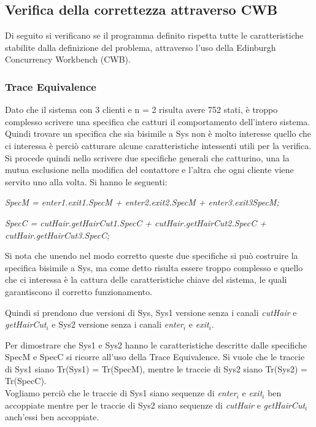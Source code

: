 \subsection{Verifica della correttezza attraverso CWB }

Di seguito si verificano se il programma definito rispetta tutte le caratteristiche stabilite dalla definizione del problema, attraverso l'uso della Edinburgh Concurrency Workbench (CWB).

\subsubsection{Trace Equivalence} 

Dato che il sistema con 3 clienti e n = 2 risulta avere 752 stati, è troppo complesso scrivere una specifica che catturi il comportamento dell'intero sistema. Quindi trovare un specifica che sia bisimile a Sys non è molto interesse quello che ci interessa è perciò catturare alcune caratteristiche intessenti utili per la verifica. Si procede quindi nello scrivere due specifiche generali che catturino, una la mutua esclusione nella modifica del contattore e l'altra che ogni cliente viene servito uno alla volta. Si hanno le seguenti:

\emph{SpecM = enter1.exit1.SpecM + enter2.exit2.SpecM + enter3.exit3SpecM;}

\emph{SpecC = cutHair.getHairCut1.SpecC + cutHair.getHairCut2.SpecC +\\ cutHair.getHairCut3.SpecC;}

Si nota che  unendo nel modo corretto queste due specifiche si può costruire la specifica bisimile a Sys, ma come detto risulta essere troppo complesso e quello che ci interessa è la cattura delle caratteristiche chiave del sistema, le quali garantiscono il corretto funzionamento.

Quindi si prendono due versioni di Sys, Sys1 versione senza i canali \emph{cutHair} e \emph{getHairCut$_{i}$} e Sys2 versione senza i canali \emph{enter$_{i}$} e \emph{exit$_{i}$}.

Per dimostrare che Sys1 e Sys2 hanno le caratteristiche descritte dalle specifiche SpecM e SpecC si ricorre all'uso della Trace Equivalence. Si vuole che le traccie di Sys1 siano Tr(Sys1) = Tr(SpecM), mentre le traccie di Sys2 siano Tr(Sys2) = Tr(SpecC). \\
Vogliamo perciò che le traccie di Sys1 siano sequenze di \emph{enter$_{i}$} e \emph{exit$_{i}$} ben accoppiate mentre per le traccie di Sys2 siano sequenze di \emph{cutHair} e \emph{getHairCut$_{i}$} anch'essi ben accoppiate.

